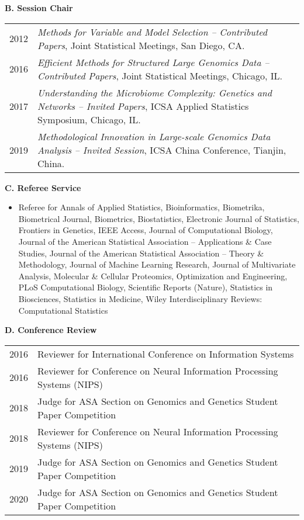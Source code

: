 \documentclass[10pt]{article}
\begin{document}
\textbf{B. Session Chair}
\begin{table}[H]
\hskip0.9cm\begin{tabular}{p{1.6cm}p{12cm}}
2012 & {\em Methods for Variable and Model Selection -- Contributed Papers}, Joint Statistical Meetings, San Diego, CA. \\
2016 & {\em Efficient Methods for Structured Large Genomics Data -- Contributed Papers}, Joint Statistical Meetings, Chicago, IL. \\
2017 & {\em  Understanding the Microbiome Complexity: Genetics and Networks -- Invited Papers}, ICSA Applied Statistics Symposium, Chicago, IL. \\
2019 & {\em Methodological Innovation in Large-scale Genomics Data Analysis -- Invited Session}, ICSA China Conference, Tianjin, China. 
\end{tabular}
\end{table}

\textbf{C. Referee Service} 
\begin{itemize}
\item[] Referee for 
Annals of Applied Statistics,
Bioinformatics, 
Biometrika, 
Biometrical Journal, 
Biometrics, 
Biostatistics, 
Electronic Journal of Statistics, 
Frontiers in Genetics, 
IEEE Access, 
Journal of Computational Biology, 
Journal of the American Statistical Association -- Applications \& Case Studies, 
Journal of the American Statistical Association -- Theory \& Methodology, 
Journal of Machine Learning Research, 
Journal of Multivariate Analysis, 
Molecular \& Cellular Proteomics, 
Optimization and Engineering, 
PLoS Computational Biology, 
Scientific Reports (Nature), 
Statistics in Biosciences, 
Statistics in Medicine,
Wiley Interdisciplinary Reviews: Computational Statistics 
\end{itemize}

\textbf{D. Conference Review}
\begin{table}[H]
\hskip0.9cm\begin{tabular}{p{1.6cm}p{12cm}}
2016 & Reviewer for  International Conference on Information Systems \\
2016 & Reviewer for  Conference on Neural Information Processing Systems (NIPS)\\
2018 & Judge for  ASA Section on Genomics and Genetics Student Paper Competition\\ 
2018 & Reviewer for  Conference on Neural Information Processing Systems (NIPS) \\
2019 & Judge for  ASA Section on Genomics and Genetics Student Paper Competition \\
2020 & Judge for  ASA Section on Genomics and Genetics Student Paper Competition \\
\end{tabular}
\end{table}
\end{document}
